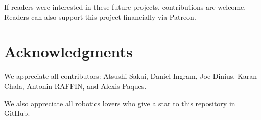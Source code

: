\documentclass{bmvc2k}
\begin{document}
If readers were interested in these future projects, contributions are welcome.
Readers can also support this project financially via Patreon\cite{patreon}.

\section{Acknowledgments}

We appreciate all contributors: Atsushi Sakai\cite{auther5}, Daniel Ingram\cite{auther1}, Joe Dinius\cite{auther2}, Karan Chala\cite{auther3}, Antonin RAFFIN\cite{auther4}, and Alexis Paques\cite{auther6}.

We also appreciate all robotics lovers who give a star to this repository in GitHub.



\end{document}
